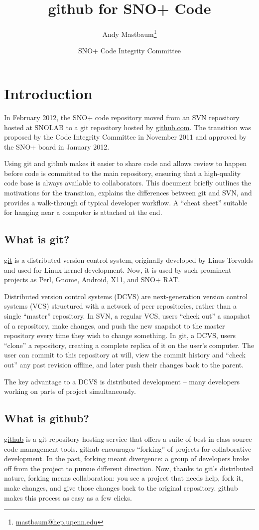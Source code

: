 \documentclass{article}
\title{github for SNO+ Code}
\author{Andy Mastbaum\footnote{\href{mailto:mastbaum@hep.upenn.edu}{mastbaum@hep.upenn.edu}}}
\date{SNO+ Code Integrity Committee}
\begin{document}
\maketitle
\tableofcontents
\section{Introduction}
In February 2012, the SNO+ code repository moved from an SVN repository hosted at SNOLAB to a git repository hosted by \href{http://github.com}{github.com}. The transition was proposed by the Code Integrity Committee in November 2011 and approved by the SNO+ board in January 2012.

Using git and github makes it easier to share code and allows review to happen before code is committed to the main repository, ensuring that a high-quality code base is always available to collaborators. This document briefly outlines the motivations for the transition, explains the differences between git and SVN, and provides a walk-through of typical developer workflow. A ``cheat sheet'' suitable for hanging near a computer is attached at the end.
\subsection{What is git?}
\href{http://git-scm.com}{git} is a distributed version control system, originally developed by Linus Torvalds and used for Linux kernel development. Now, it is used by such prominent projects as Perl, Gnome, Android, X11, and SNO+ RAT.

Distributed version control systems (DCVS) are next-generation version control systems (VCS) structured with a network of peer repositories, rather than a single ``master'' repository. In SVN, a regular VCS, users ``check out'' a snapshot of a repository, make changes, and push the new snapshot to the master repository every time they wish to change something. In git, a DCVS, users ``clone'' a repository, creating a complete replica of it on the user's computer. The user can commit to this repository at will, view the commit history and ``check out'' any past revision offline, and later push their changes back to the parent.

The key advantage to a DCVS is distributed development -- many developers working on parts of project simultaneously.
\subsection{What is github?}
\href{http://www.github.com}{github} is a git repository hosting service that offers a suite of best-in-class source code management tools. github encourages ``forking'' of projects for collaborative development. In the past, forking meant divergence: a group of developers broke off from the project to pursue different direction. Now, thanks to git's distributed nature, forking means collaboration: you see a project that needs help, fork it, make changes, and give those changes back to the original repository. github makes this process as easy as a few clicks.
\end{document}
